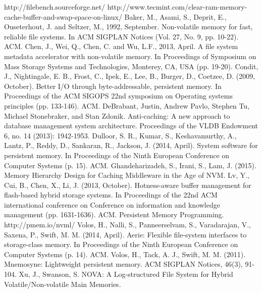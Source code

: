 \begin{thebibliography}{99}
 http://filebench.sourceforge.net/
 http://www.tecmint.com/clear-ram-memory-cache-buffer-and-swap-space-on-linux/
 Baker, M., Asami, S., Deprit, E., Ouseterhout, J. and Seltzer, M., 1992, September. Non-volatile memory for fast, reliable file systems. In ACM SIGPLAN Notices (Vol. 27, No. 9, pp. 10-22). ACM.	
 Chen, J., Wei, Q., Chen, C. and Wu, L.F., 2013, April. A file system metadata accelerator with non-volatile memory. In Proceedings of Symposium on Mass Storage Systems and Technologies, Monterey, CA, USA (pp. 19-20).
 Condit, J., Nightingale, E. B., Frost, C., Ipek, E., Lee, B., Burger, D.,  Coetzee, D. (2009, October). Better I/O through byte-addressable, persistent memory. In Proceedings of the ACM SIGOPS 22nd symposium on Operating systems principles (pp. 133-146). ACM.
 DeBrabant, Justin, Andrew Pavlo, Stephen Tu, Michael Stonebraker, and Stan Zdonik. Anti-caching: A new approach to database management system architecture. Proceedings of the VLDB Endowment 6, no. 14 (2013): 1942-1953.
 Dulloor, S. R., Kumar, S., Keshavamurthy, A., Lantz, P., Reddy, D., Sankaran, R., Jackson, J. (2014, April). System software for persistent memory. In Proceedings of the Ninth European Conference on Computer Systems (p. 15). ACM.
 Ghandeharizadeh, S., Irani, S., Lam, J. (2015). Memory Hierarchy Design for Caching Middleware in the Age of NVM.
 Lv, Y., Cui, B., Chen, X., Li, J. (2013, October). Hotness-aware buffer management for flash-based hybrid storage systems. In Proceedings of the 22nd ACM international conference on Conference on information and knowledge management (pp. 1631-1636). ACM.	
 Persistent Memory Programming. http://pmem.io/nvml/
 Volos, H., Nalli, S., Panneerselvam, S., Varadarajan, V., Saxena, P., Swift, M. M. (2014, April). Aerie: Flexible file-system interfaces to storage-class memory. In Proceedings of the Ninth European Conference on Computer Systems (p. 14). ACM.
 Volos, H., Tack, A. J., Swift, M. M. (2011). Mnemosyne: Lightweight persistent memory. ACM SIGPLAN Notices, 46(3), 91-104.	
 Xu, J., Swanson, S. NOVA: A Log-structured File System for Hybrid Volatile/Non-volatile Main Memories.
\end{thebibliography}


